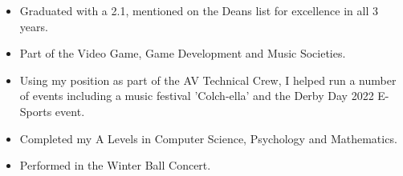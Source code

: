 \documentclass[10pt,a4paper,ragged2e,withhyper]{altacv}
\begin{document}



%
%
%
%
%
%
%
%


\begin{itemize}
	\item Graduated with a 2.1, mentioned on the Deans list for excellence in all 3 years.
	\item Part of the Video Game, Game Development and Music Societies.
	\item Using my position as part of the AV Technical Crew, I helped run a number of events including a music festival 'Colch-ella' and the Derby Day 2022 E-Sports event.
\end{itemize}


\divider


\begin{itemize}
	\item Completed my A Levels in Computer Science, Psychology and Mathematics.
    \item Performed in the Winter Ball Concert.
\end{itemize}
\end{document}
